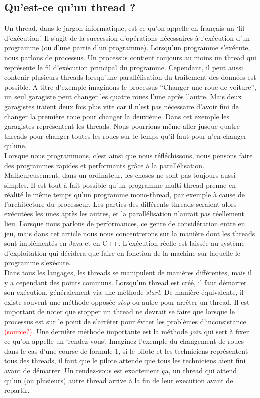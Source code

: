 \documentclass[a4paper,twoside,10pt,english,french,twocolumn]{article}
\theoremstyle{definition}
\theoremstyle{remark}
\theoremstyle{plain}
\begin{document}
\subsection{Qu'est-ce qu'un thread ?}
Un thread, dans le jargon informatique, est ce qu'on appelle en français un \enquote*{fil d’exécution}. Il s'agit de la succession d'opérations nécessaires à l’exécution d'un programme (ou d'une partie d'un programme). Lorsqu'un programme s’exécute, nous parlons de processus. Un processus contient toujours au moins un thread qui représente le fil d’exécution principal du programme. Cependant, il peut aussi contenir plusieurs threads lorsqu'une parallélisation du traitement des données est possible. A titre d'exemple imaginons le processus \enquote{Changer une roue de voiture}, un seul garagiste peut changer les quatre roues l'une après l'autre. Mais deux garagistes iraient deux fois plus vite car il n'est pas nécessaire d’avoir fini de changer la première roue pour changer la deuxième. Dans cet exemple les garagistes représentent les threads. Nous pourrions même aller jusque quatre threads pour changer toutes les roues sur le temps qu'il faut pour n'en changer qu'une.\\
Lorsque nous programmons, c'est ainsi que nous réfléchissons, nous pensons faire des programmes rapides et performants grâce à la parallélisation. Malheureusement, dans un ordinateur, les choses ne sont pas toujours aussi simples. Il est tout à fait possible qu'un programme multi-thread prenne en réalité le même temps qu'un programme mono-thread, par exemple à cause de l'architecture du processeur. Les parties des différents threads seraient alors exécutées les unes après les autres, et la parallélisation n'aurait pas réellement lieu. Lorsque nous parlons de performances, ce genre de considération entre en jeu, mais dans cet article nous nous concentrerons sur la manière dont les threads sont implémentés en Java et en C++. L'exécution réelle est laissée au système d'exploitation qui décidera que faire en fonction de la machine sur laquelle le programme s'exécute.\\
Dans tous les langages, les threads se manipulent de manières différentes, mais il y a cependant des points communs. Lorsqu'un thread est créé, il faut démarrer son exécution, généralement via une méthode \textit{start}. De manière équivalente, il existe souvent une méthode opposée \textit{stop} ou autre pour arrêter un thread. Il est important de noter que stopper un thread ne devrait se faire que lorsque le processus est sur le point de s'arrêter pour éviter les problèmes d'inconsistance \textcolor{red}{(source?)}. Une dernière méthode importante est la méthode \textit{join} qui sert à fixer ce qu'on appelle un \enquote*{rendez-vous}. Imaginez l'exemple du changement de roues dans le cas d'une course de formule 1, si le pilote et les techniciens représentent tous des threads, il faut que le pilote attende que tous les techniciens aient fini avant de démarrer. Un rendez-vous est exactement ça, un thread qui attend qu'un (ou plusieurs) autre thread arrive à la fin de leur execution avant de repartir.
\end{document}
